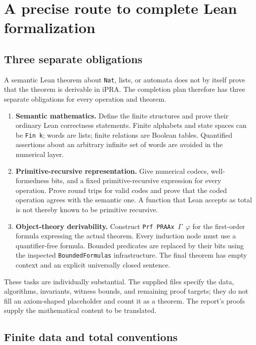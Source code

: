 \section{A precise route to complete Lean formalization}
\label{sec:lean}

\subsection{Three separate obligations}

A semantic Lean theorem about \texttt{Nat}, lists, or automata does not by
itself prove that the theorem is derivable in iPRA. The completion plan
therefore has three separate obligations for every operation and theorem.

\begin{enumerate}
\item \textbf{Semantic mathematics.} Define the finite structures and
prove their ordinary Lean correctness statements. Finite alphabets and
state spaces can be \texttt{Fin k}; words are lists; finite relations
are Boolean tables. Quantified assertions about an arbitrary infinite
set of words are avoided in the numerical layer.
\item \textbf{Primitive-recursive representation.} Give numerical codecs,
well-formedness bits, and a fixed primitive-recursive expression for every
operation. Prove round trips for valid codes and prove that the coded
operation agrees with the semantic one. A function that Lean accepts as
total is not thereby known to be primitive recursive.
\item \textbf{Object-theory derivability.} Construct
\texttt{Prf PRAAx \(\Gamma\) \(\varphi\)} for the first-order formula
expressing the actual theorem. Every induction node must use a
quantifier-free formula. Bounded predicates are replaced by their bits
using the inspected \texttt{BoundedFormulas} infrastructure. The final
theorem has empty context and an explicit universally closed sentence.
\end{enumerate}

These tasks are individually substantial. The supplied files specify the
data, algorithms, invariants, witness bounds, and remaining proof targets;
they do not fill an axiom-shaped placeholder and count it as a theorem.
The report's proofs supply the mathematical content to be translated.

\subsection{Finite data and total conventions}

